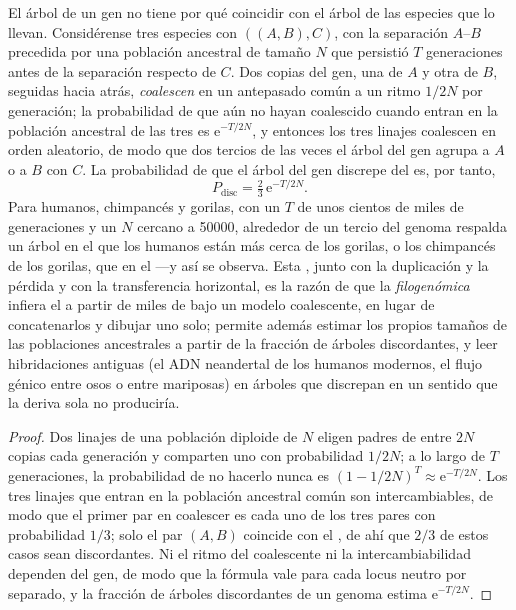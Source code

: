 \begin{proposition}\label{prop:b3:molecular-evolution:ils}
El árbol de un gen no tiene por qué coincidir con el árbol de las
especies que lo llevan. Considérense tres especies con  $((A,B),C)$, con la separación $A$--$B$ precedida por una
población ancestral de tamaño $N$ que persistió $T$ generaciones antes
de la separación respecto de $C$. Dos copias del gen, una de $A$ y otra
de $B$, seguidas hacia atrás, \emph{coalescen} en un antepasado común a
un ritmo $1/2N$ por generación; la probabilidad de que aún no hayan
coalescido cuando entran en la población ancestral de las tres es
$\mathrm{e}^{-T/2N}$, y entonces los tres linajes coalescen en orden
aleatorio, de modo que dos tercios de las veces el árbol del gen agrupa
a $A$ o a $B$ con $C$. La probabilidad de que el árbol del gen
discrepe del  es, por tanto,
\[
P_{\text{disc}} = \tfrac{2}{3}\,\mathrm{e}^{-T/2N} .
\]
Para humanos, chimpancés y gorilas, con un $T$ de unos cientos de miles
de generaciones y un $N$ cercano a \num{50000}, alrededor de un tercio
del genoma respalda un árbol en el que los humanos están más cerca de
los gorilas, o los chimpancés de los gorilas, que en el  ---y así se observa. Esta \emph{}, junto con la duplicación y la pérdida y con la transferencia
horizontal, es la razón de que la \emph{filogenómica} infiera el  a partir de miles de  bajo un modelo
coalescente, en lugar de concatenarlos y dibujar uno solo; permite
además estimar los propios tamaños de las poblaciones ancestrales a
partir de la fracción de árboles discordantes, y leer hibridaciones
antiguas (el ADN neandertal de los humanos modernos, el flujo génico
entre osos o entre mariposas) en árboles que discrepan en un sentido
que la deriva sola no produciría.
\end{proposition}
\begin{proof}
Dos linajes de una población diploide de $N$ eligen padres de entre $2N$
copias cada generación y comparten uno con probabilidad $1/2N$; a lo
largo de $T$ generaciones, la probabilidad de no hacerlo nunca es
$(1 - 1/2N)^{T} \approx
\mathrm{e}^{-T/2N}$. Los tres linajes que entran en la población
ancestral común son intercambiables, de modo que el primer par en
coalescer es cada uno de los tres pares con probabilidad $1/3$; solo el
par $(A,B)$ coincide con el , de ahí que $2/3$ de
estos casos sean discordantes. Ni el ritmo del coalescente ni la
intercambiabilidad dependen del gen, de modo que la fórmula vale para
cada locus neutro por separado, y la fracción de árboles discordantes
de un genoma estima $\mathrm{e}^{-T/2N}$.
\end{proof}

